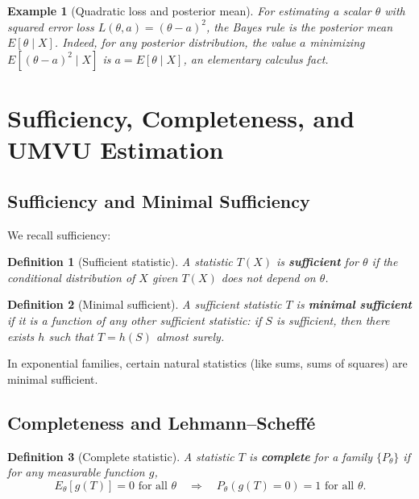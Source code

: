 \documentclass[11pt,a4paper]{article}
\newtheorem{definition}{Definition}[section]
\newtheorem{example}{Example}[section]
\numberwithin{equation}{section}
\begin{document}
\begin{example}[Quadratic loss and posterior mean]
For estimating a scalar $\theta$ with squared error loss $L(\theta,a)=(\theta-a)^2$, the Bayes rule is the posterior mean $E[\theta\mid X]$. 
Indeed, for any posterior distribution, the value $a$ minimizing $E[(\theta-a)^2 \mid X]$ is $a=E[\theta\mid X]$, an elementary calculus fact.

\end{example}

\newpage

\section{Sufficiency, Completeness, and UMVU Estimation}

\subsection{Sufficiency and Minimal Sufficiency}

We recall sufficiency:

\begin{definition}[Sufficient statistic]
A statistic $T(X)$ is \textbf{sufficient} for $\theta$ if the conditional distribution of $X$ given $T(X)$ does not depend on $\theta$.
\end{definition}

\begin{definition}[Minimal sufficient]
A sufficient statistic $T$ is \textbf{minimal sufficient} if it is a function of any other sufficient statistic: if $S$ is sufficient, then there exists $h$ such that $T=h(S)$ almost surely.
\end{definition}

In exponential families, certain natural statistics (like sums, sums of squares) are minimal sufficient.

\subsection{Completeness and Lehmann--Scheff\'e}

\begin{definition}[Complete statistic]
A statistic $T$ is \textbf{complete} for a family $\{P_\theta\}$ if for any measurable function $g$,
\[
E_\theta[g(T)] = 0 \text{ for all } \theta
\quad\Rightarrow\quad
P_\theta(g(T)=0)=1 \text{ for all } \theta.
\]
\end{definition}
\end{document}
